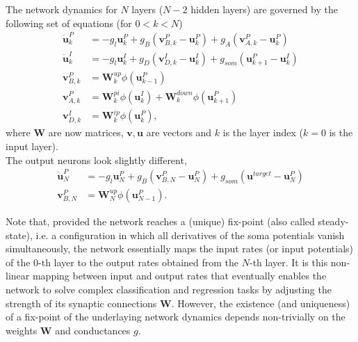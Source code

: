 \documentclass[12pt,a4paper]{article}
\begin{document}
The network dynamics for $N$ layers ($N-2$ hidden layers) are governed by the following set of equations (for $0<k<N$) 
\begin{align}
\dot{\bm{u}}^P_k &= -g_l\bm{u}^P_k + g_B(\bm{v}^P_{B,k} - \bm{u}^P_k) + g_A(\bm{v}^P_{A,k} - \bm{u}^P_k)\label{eq:dyn_hidden}\\
\dot{\bm{u}}^I_k &= -g_l\bm{u}^I_k + g_D(\bm{v}^I_{D,k} - \bm{u}^I_k) + g_{som}(\bm{u}^P_{k+1} - \bm{u}^I_k)\\
\bm{v}^P_{B,k} &= \bm{W}^{up}_k\phi(\bm{u}^P_{k-1})\\
\bm{v}^P_{A,k} &= \bm{W}^{pi}_k\phi(\bm{u}^I_{k}) + \bm{W}^{down}_k\phi(\bm{u}^P_{k+1})\label{eq:apical}\\
\bm{v}^I_{D,k} &= \bm{W}^{ip}_k\phi(\bm{u}^P_{k}),
\end{align}
where $\bm{W}$ are now matrices, $\bm{v},\bm{u}$ are vectors and $k$ is the layer index ($k=0$ is the input layer).\\
The output neurons look slightly different,
\begin{align}
\dot{\bm{u}}^P_N &= -g_l\bm{u}^P_N + g_B(\bm{v}^P_{B,N} - \bm{u}^P_N) + g_{som}(\bm{u}^{target} - \bm{u}^P_N)\\
\bm{v}^P_{B,N} &= \bm{W}^{up}_N\phi(\bm{u}^P_{N-1}).\label{eq:dyn_out}
\end{align}

Note that, provided the network reaches a (unique) fix-point (also called steady-state), i.e. a configuration in which all derivatives of the soma potentials vanish simultaneously, the network essentially maps the input rates (or input potentials) of the $0$-th layer to the output rates obtained from the $N$-th layer. It is this non-linear mapping between input and output rates that eventually enables the network to solve complex classification and regression tasks by adjusting the strength of its synaptic connections $\bm{W}$. However, the existence (and uniqueness) of a fix-point of the underlaying network dynamics depends non-trivially on the weights $\bm{W}$ and conductances $g$. 
\end{document}
